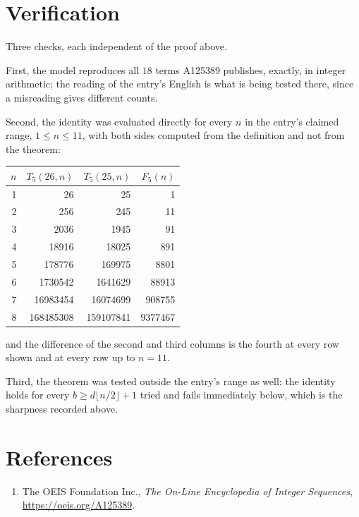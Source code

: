 \documentclass[11pt,a4paper]{article}
\theoremstyle{plain}
\theoremstyle{definition}
\begin{document}
\section{Verification}

Three checks, each independent of the proof above.

First, the model reproduces all $18$ terms A125389 publishes, exactly, in integer
arithmetic; the reading of the entry's English is what is being tested there, since a
misreading gives different counts.

Second, the identity was evaluated directly for every $n$ in the entry's claimed range,
$1\le n\le11$, with both sides computed from the definition and not from the theorem:

\begin{center}
\begin{tabular}{rrrr}
$n$ & $T_{5}(26,n)$ & $T_{5}(25,n)$ & $F_{5}(n)$ \\ \hline
1 & 26 & 25 & 1 \\
2 & 256 & 245 & 11 \\
3 & 2036 & 1945 & 91 \\
4 & 18916 & 18025 & 891 \\
5 & 178776 & 169975 & 8801 \\
6 & 1730542 & 1641629 & 88913 \\
7 & 16983454 & 16074699 & 908755 \\
8 & 168485308 & 159107841 & 9377467 \\
\end{tabular}
\end{center}

\noindent and the difference of the second and third columns is the fourth at every row shown
and at every row up to $n=11$.

Third, the theorem was tested outside the entry's range as well: the identity holds for every
$b\ge d\lfloor n/2\rfloor+1$ tried and fails immediately below, which is the sharpness recorded
above.

\section*{References}
\begin{enumerate}
\item The OEIS Foundation Inc., \emph{The On-Line Encyclopedia of Integer Sequences},
\url{https://oeis.org/A125389}.
\end{enumerate}
\end{document}
